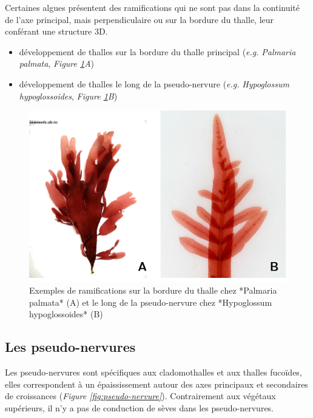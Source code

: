 \documentclass[
]{book}
\begin{document}
Certaines algues présentent des ramifications qui ne sont pas dans la continuité de l'axe principal, mais perpendiculaire ou sur la bordure du thalle, leur conférant une structure 3D.

\begin{itemize}
\item
  développement de thalles sur la bordure du thalle principal (\emph{e.g.} \emph{Palmaria palmata}, \emph{Figure \ref{fig:croiss-lateral}A})
\item
  développement de thalles le long de la pseudo-nervure (\emph{e.g.} \emph{Hypoglossum hypoglossoides}, \emph{Figure \ref{fig:croiss-lateral}B})
\end{itemize}

\begin{figure}[H]

{\centering \includegraphics[width=0.7\linewidth]{./images/croissance_lateral} 

}

\caption{Exemples de ramifications sur la bordure du thalle chez *Palmaria palmata* (A) et le long de la pseudo-nervure chez *Hypoglossum hypoglossoides* (B)}\label{fig:croiss-lateral}
\end{figure}

\hypertarget{les-pseudo-nervures}{%
\subsection{Les pseudo-nervures}\label{les-pseudo-nervures}}

Les pseudo-nervures sont spécifiques aux cladomothalles et aux thalles fucoïdes, elles correspondent à un épaississement autour des axes principaux et secondaires de croissances (\emph{Figure \ref{fig:pseudo-nervure}}). Contrairement aux végétaux supérieurs, il n'y a pas de conduction de sèves dans les pseudo-nervures.
\end{document}
